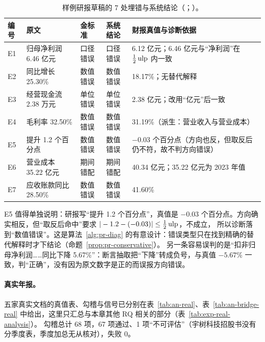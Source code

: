 \begin{table}[t]
\centering
\caption{样例研报草稿的 7 处埋错与系统结论（；）。}
\label{tab:exp-sample-errors}
\small
\begin{tabularx}{\linewidth}{@{}l l l l X@{}}
\toprule
编号 & 原文 & 金标准 & 系统结论 & 财报真值与诊断依据 \\
\midrule
E1 & 归母净利润 6.46 亿元 & 口径错误 & 口径错误 & 6.12 亿元；6.46 亿元与“净利润”在 $\tfrac12\operatorname{ulp}$ 内一致 \\
E2 & 同比增长 25.30\% & 数值错误 & 数值错误 & 18.17\%；无替代解释 \\
E3 & 经营现金流 2.38 万元 & 单位错误 & 单位错误 & 2.38 亿元；改用“亿元”后一致 \\
E4 & 毛利率 32.50\% & 数值错误 & 数值错误 & 31.19\%（派生：营业收入与营业成本） \\
E5 & 提升 1.2 个百分点 & 数值错误 & 数值错误 & $-0.03$ 个百分点（方向也反，但取反后仍不符，故不判方向错误） \\
E6 & 营业成本 35.22 亿元 & 期间错配 & 期间错配 & 40.34 亿元；35.22 亿元为 2023 年值 \\
E7 & 应收账款同比 28.50\% & 数值错误 & 数值错误 & 41.60\% \\
\bottomrule
\end{tabularx}
\end{table}

E5 值得单独说明：研报写“提升 1.2 个百分点”，真值是 $-0.03$ 个百分点。方向确实相反，但“取反后命中”要求 $|-1.2-(-0.03)|\le\tfrac12\operatorname{ulp}$，不成立，
所以诊断落到“数值错误”。这是算法~\ref{alg:pr-diag} 的有意设计：错误类型只在找到精确的替代解释时才下结论（命题~\ref{prop:pr-conservative}）。
另一条容易误判的是“扣非归母净利润……同比下降 5.67\%”：断言抽取把“下降”转成负号，与真值 $-5.67\%$ 一致，判“正确”，没有因为原文数字是正的而误报方向错误。

\paragraph{真实年报。}五家真实文档的真值表、勾稽与信号已分别在表~\ref{tab:an-real}、表~\ref{tab:an-bridge-real} 中给出，这里只汇总与本章其他 RQ 相关的部分（表~\ref{tab:exp-real-analysis}）。
勾稽总计 68 项，67 项通过、1 项“不可评估”（宇树科技招股书没有分季度表，季度加总无从核对），失败 0。

